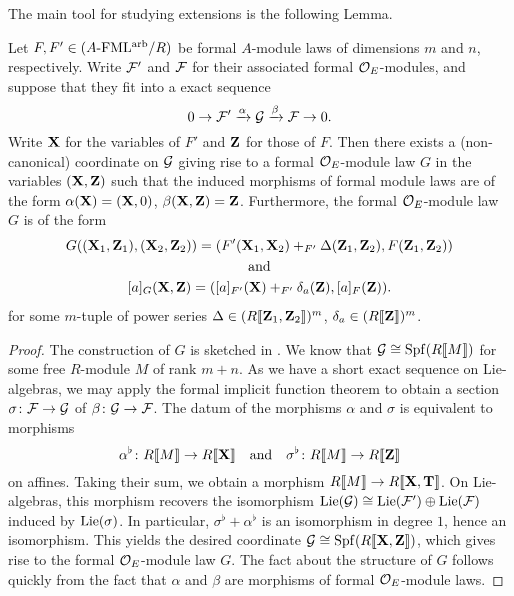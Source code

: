 \documentclass[../main.tex]{subfiles}
\begin{document}
The main tool for studying extensions is the following Lemma.
\begin{lem}\label{lem:SESStandardForm}
  Let $F, F' \in {({A}\textnormal-\allowbreak\mathrm{FML^{arb}}/{R})}$ be 
  formal $A$-module laws of dimensions $m$ and $n$, respectively. Write 
  $\mathcal{F}'$ and $\mathcal{F}$ for their associated formal $\mathcal{O}_E$-modules,
  and suppose that they fit into a exact sequence
  \begin{equation*}
    0 \to \mathcal{F}' \xrightarrow{\alpha} \mathcal{G} \xrightarrow{\beta} \mathcal{F} \to 0.
  \end{equation*}
  Write $\mathbf{X}$ for the variables of $F'$ and $\mathbf{Z}$ for those of $F$. Then 
  there exists a (non-canonical) coordinate on $\mathcal{G}$ giving rise to a formal
  $\mathcal{O}_E$-module law $G$ in the variables $(\mathbf{X}, \mathbf{Z})$ such that the induced morphisms
  of formal module laws are of the form 
  $\alpha(\mathbf{X}) = (\mathbf{X}, 0)$, $\beta(\mathbf{X}, \mathbf{Z}) = \mathbf{Z}$. Furthermore, 
  the formal $\mathcal{O}_E$-module law $G$ is of the form
  \begin{equation}\label{eq:SESStandardFormModuleLaw}
  \begin{gathered}
    G((\mathbf{X}_1, \mathbf{Z}_1), (\mathbf{X}_2, \mathbf{Z}_2)) = (F'(\mathbf{X}_1, \mathbf{X}_2) +_{F'} \Delta(\mathbf{Z}_1,
    \mathbf{Z}_2) , F(\mathbf{Z}_1, \mathbf{Z}_2)) \\
    \text{and} \\
    [a]_G(\mathbf{X}, \mathbf{Z}) = ([a]_{F'}(\mathbf{X}) +_{F'} \delta_a(\mathbf{Z}), [a]_F(\mathbf{Z})).
  \end{gathered}
  \end{equation}
  for some $m$-tuple of power series $\Delta \in (R\llbracket \mathbf{Z}_1, \mathbf{Z}_2 \rrbracket)^m$,
  $\delta_a \in (R\llbracket \mathbf{Z} \rrbracket)^m$. 
\begin{proof}
  The construction of $G$ is sketched in \cite[Proposition
  6.5]{hopkins1994equivariant}. We know that $\mathcal{G} \cong \operatorname{Spf}(R\llbracket M \rrbracket)$ 
  for some free $R$-module $M$ of rank $m+n$. As we have a short 
  exact sequence on Lie-algebras, we may apply the formal implicit function
  theorem to obtain a section 
  $\sigma\colon \mathcal{F} \to \mathcal{G}$ of $\beta\colon \mathcal{G} \to \mathcal{F}$. 
  The datum of the morphisms $\alpha$ and $\sigma$ is equivalent to 
  morphisms
  \begin{equation*}
    \alpha^\flat\colon R \llbracket M \rrbracket \to R \llbracket \mathbf{X} \rrbracket \quad \text{and} \quad
    \sigma^\flat\colon R \llbracket M \rrbracket \to R \llbracket \mathbf{Z} \rrbracket
  \end{equation*}
  on affines. Taking their sum, we obtain a morphism $R \llbracket M \rrbracket
  \to R\llbracket \mathbf{X}, \mathbf{T} \rrbracket$. On Lie-algebras, this morphism recovers the
  isomorphism $\operatorname{Lie}(\mathcal{G}) \cong \operatorname{Lie}(\mathcal{F}') \oplus \operatorname{Lie}(\mathcal{F})$ induced by 
  $\operatorname{Lie}(\sigma)$. In particular, $\sigma^\flat + \alpha^\flat$ is an isomorphism
  in degree $1$, hence an isomorphism. This yields the desired
  coordinate $\mathcal{G} \cong \operatorname{Spf}(R\llbracket \mathbf{X}, \mathbf{Z}\rrbracket)$, which gives rise 
  to the formal $\mathcal{O}_E$-module law $G$. The fact about the 
  structure of $G$ follows quickly from the fact that 
  $\alpha$ and $\beta$ are morphisms of formal $\mathcal{O}_E$-module laws. 
\end{proof}
\end{lem}
\end{document}
